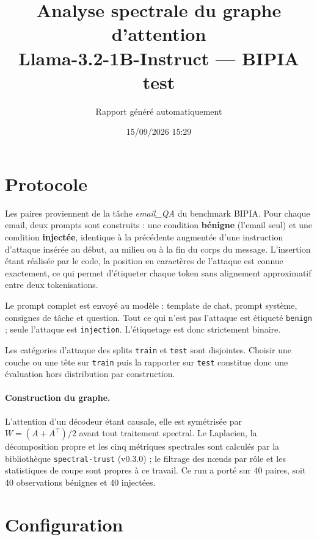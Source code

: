 \documentclass[11pt,a4paper]{article}
\title{Analyse spectrale du graphe d'attention\\Llama-3.2-1B-Instruct --- BIPIA test}
\author{Rapport généré automatiquement}
\date{15/09/2026 15:29}
\begin{document}
\maketitle

\section{Protocole}


Les paires proviennent de la tâche \emph{email\_QA} du benchmark BIPIA.
Pour chaque email, deux prompts sont construits : une condition \textbf{bénigne}
(l'email seul) et une condition \textbf{injectée}, identique à la précédente
augmentée d'une instruction d'attaque insérée au début, au milieu ou à la fin
du corps du message. L'insertion étant réalisée par le code, la position en
caractères de l'attaque est connue exactement, ce qui permet d'étiqueter chaque
token sans alignement approximatif entre deux tokenisations.

Le prompt complet est envoyé au modèle : template de chat, prompt système,
consignes de tâche et question. Tout ce qui n'est pas l'attaque est étiqueté
\texttt{benign} ; seule l'attaque est \texttt{injection}. L'étiquetage est
donc strictement binaire.

Les catégories d'attaque des splits \texttt{train} et \texttt{test} sont
disjointes. Choisir une couche ou une tête sur \texttt{train} puis la
rapporter sur \texttt{test} constitue donc une évaluation hors distribution
par construction.

\paragraph{Construction du graphe.} L'attention d'un décodeur étant causale,
elle est symétrisée par $W = (A + A^{\top})/2$ avant tout traitement spectral.
Le Laplacien, la décomposition propre et les cinq métriques spectrales sont
calculés par la bibliothèque \texttt{spectral-trust} (v0.3.0) ; le filtrage
des n\oe uds par rôle et les statistiques de coupe sont propres à ce travail.
Ce run a porté sur 40 paires, soit 40 observations bénignes et
40 injectées.


\section{Configuration}
\end{document}
